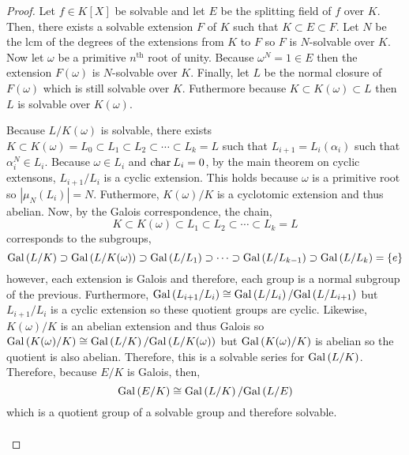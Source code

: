\documentclass[12pt]{extarticle}
\begin{document}
\begin{proof}
Let $f \in K[X]$ be solvable and let $E$ be the splitting field of $f$ over $K$. Then, there exists a solvable extension $F$ of $K$ such that $K \subset E \subset F$. Let $N$ be the $\mathrm{lcm}$ of the degrees of the extensions from $K$ to $F$ so $F$ is $N$-solvable over $K$. Now let $\omega$ be a primitive $n^{\mathrm{th}}$ root of unity. Because $\omega^N = 1 \in E$ then the extension $F(\omega)$ is $N$-solvable over $K$. Finally, let $L$ be the normal closure of $F(\omega)$ which is still solvable over $K$. Futhermore because $K \subset K(\omega) \subset L$ then $L$ is solvable over $K(\omega)$. 

\begin{center}
\end{center}
Because $L/K(\omega)$ is solvable, there exists $K \subset K(\omega) = L_0 \subset L_1 \subset L_2 \subset \cdots \subset L_k = L$ such that $L_{i + 1} = L_i(\alpha_i)$ such that $\alpha_i^N \in L_i$. Because $\omega \in L_i$ and $\mathrm{char} \: L_i = 0$, by the main theorem on cyclic extensons, $L_{i+1}/L_i$ is a cyclic extension. This holds because $\omega$ is a primitive root so $|\mu_N(L_i)| = N$. Futhermore, $K(\omega)/K$ is a cyclotomic extension and thus abelian. Now, by the Galois correspondence, the chain,
\[K \subset K(\omega) \subset L_1 \subset L_2 \subset \cdots \subset L_k = L\]
corresponds to the subgroups,
\[\mathrm{Gal}\left( L/K \right) \supset \mathrm{Gal}\left( L/K(\omega) \right) \supset \mathrm{Gal}\left( L/L_1 \right) \supset \cdots \supset \mathrm{Gal}\left( L/L_{k-1} \right) \supset \mathrm{Gal}\left( L/L_k \right) = \{e\}\]
however, each extension is Galois and therefore, each group is a normal subgroup of the previous. Furthermore, $\mathrm{Gal}\left( L_{i+1}/L_i \right) \cong \mathrm{Gal}\left( L/L_{i} \right)/\mathrm{Gal}\left( L/L_{i+1} \right)$ but $L_{i+1}/L_i$ is a cyclic extension so these quotient groups are cyclic. Likewise, $K(\omega)/K$ is an abelian extension and thus Galois so $\mathrm{Gal}\left( K(\omega)/K \right) \cong \mathrm{Gal}\left( L/K \right)/\mathrm{Gal}\left( L/K(\omega) \right)$ but $\mathrm{Gal}\left( K(\omega)/K \right)$ is abelian so the quotient is also abelian. Therefore, this is a solvable series for $\mathrm{Gal}\left( L/K \right)$. Therefore, because $E/K$ is Galois, then, 
\[\mathrm{Gal}\left( E/K \right) \cong \mathrm{Gal}\left( L/K \right) /\mathrm{Gal}\left( L/E \right)\] which is a quotient group of a solvable group and therefore solvable. \bigskip \\\\

\end{proof}
\end{document}
